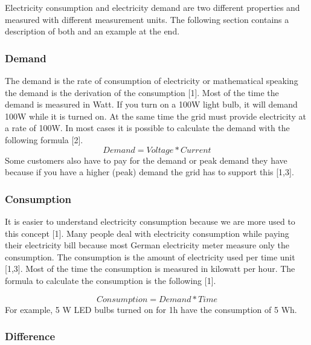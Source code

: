 Electricity consumption and electricity demand are two different properties and measured with different measurement units.
The following section contains a description of both and an example at the end.

\subsubsection{Demand}

The demand is the rate of consumption of electricity or mathematical speaking the demand is the derivation of the consumption [1]. %
Most of the time the demand is measured in Watt. If you turn on a 100W light bulb, it will demand 100W while it is turned on. At the same time the grid must provide electricity at a rate of 100W. In most cases it is possible to calculate the demand with the following formula [2]. %
\begin{equation*}
	Demand = Voltage * Current
\end{equation*}
Some customers also have to pay for the demand or peak demand they have because if you have a higher (peak) demand the grid has to support this [1,3].  %


\subsubsection{Consumption}

It is easier to understand electricity consumption because we are more used to this concept [1]. Many people deal with electricity consumption while paying their electricity bill because most German electricity meter measure only the consumption. %
The consumption is the amount of electricity used per time unit [1,3]. Most of the time the consumption is measured in kilowatt per hour.
The formula to calculate the consumption is the following [1]. %

\begin{equation*}
	Consumption = Demand * Time
\end{equation*}
For example, 5 W LED bulbs turned on for 1h have the consumption of 5 Wh.
\subsubsection{Difference}

